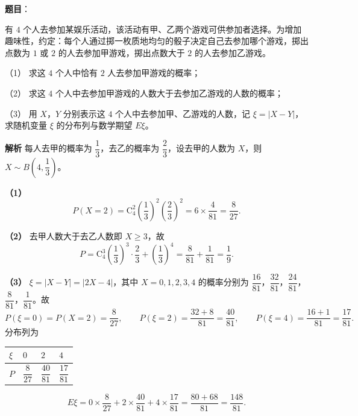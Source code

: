 \begin{answer}

\textbf{题目}：

有 $4$ 个人去参加某娱乐活动，该活动有甲、乙两个游戏可供参加者选择。为增加趣味性，约定：每个人通过掷一枚质地均匀的骰子决定自己去参加哪个游戏，掷出点数为 $1$ 或 $2$ 的人去参加甲游戏，掷出点数大于 $2$ 的人去参加乙游戏。

（1） 求这 $4$ 个人中恰有 $2$ 人去参加甲游戏的概率；

（2） 求这 $4$ 个人中去参加甲游戏的人数大于去参加乙游戏的人数的概率；

（3） 用 $X$，$Y$ 分别表示这 $4$ 个人中去参加甲、乙游戏的人数，记 $\xi=|X-Y|$，求随机变量 $\xi$ 的分布列与数学期望 $E\xi$。

\textbf{解析}
每人去甲的概率为 $\dfrac13$，去乙的概率为 $\dfrac23$，设去甲的人数为 $X$，则 $X\sim B\left(4,\dfrac13\right)$。

\textbf{（1）}
\nopagebreak[4]
\[P(X=2)=\mathrm C_4^2\left(\frac13\right)^2\left(\frac23\right)^2=6\times\frac4{81}=\frac8{27}.\]

\textbf{（2）} 去甲人数大于去乙人数即 $X\geqslant3$，故
\nopagebreak[4]
\[P=\mathrm C_4^3\left(\frac13\right)^3\cdot\frac23+\left(\frac13\right)^4=\frac8{81}+\frac1{81}=\frac19.\]

\textbf{（3）} $\xi=|X-Y|=|2X-4|$，其中 $X=0,1,2,3,4$ 的概率分别为 $\dfrac{16}{81}$，$\dfrac{32}{81}$，$\dfrac{24}{81}$，$\dfrac8{81}$，$\dfrac1{81}$。故
\nopagebreak[4]
\[P(\xi=0)=P(X=2)=\frac8{27},\qquad P(\xi=2)=\frac{32+8}{81}=\frac{40}{81},\qquad P(\xi=4)=\frac{16+1}{81}=\frac{17}{81}.\]
分布列为

\begin{center}
\begin{tabular}{llll}
\toprule
$\xi$ & $0$ & $2$ & $4$ \\
\midrule
$P$ & $\dfrac8{27}$ & $\dfrac{40}{81}$ & $\dfrac{17}{81}$ \\
\bottomrule
\end{tabular}
\end{center}

\nopagebreak[4]
\[E\xi=0\times\frac8{27}+2\times\frac{40}{81}+4\times\frac{17}{81}=\frac{80+68}{81}=\frac{148}{81}.\]




\end{answer}
